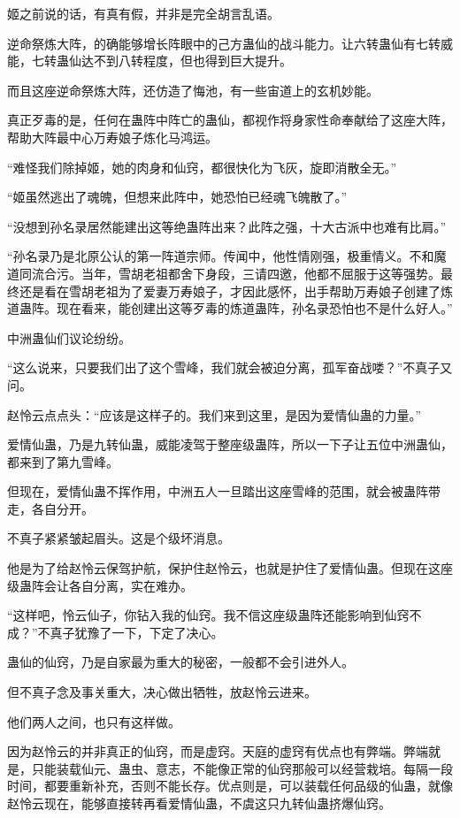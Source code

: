\begin{this_body}
姬之前说的话，有真有假，并非是完全胡言乱语。

逆命祭炼大阵，的确能够增长阵眼中的己方蛊仙的战斗能力。让六转蛊仙有七转威能，七转蛊仙达不到八转程度，但也得到巨大提升。

而且这座逆命祭炼大阵，还仿造了悔池，有一些宙道上的玄机妙能。

真正歹毒的是，任何在蛊阵中阵亡的蛊仙，都视作将身家性命奉献给了这座大阵，帮助大阵最中心万寿娘子炼化马鸿运。

“难怪我们除掉姬，她的肉身和仙窍，都很快化为飞灰，旋即消散全无。”

“姬虽然逃出了魂魄，但想来此阵中，她恐怕已经魂飞魄散了。”

“没想到孙名录居然能建出这等绝蛊阵出来？此阵之强，十大古派中也难有比肩。”

“孙名录乃是北原公认的第一阵道宗师。传闻中，他性情刚强，极重情义。不和魔道同流合污。当年，雪胡老祖都舍下身段，三请四邀，他都不屈服于这等强势。最终还是看在雪胡老祖为了爱妻万寿娘子，才因此感怀，出手帮助万寿娘子创建了炼道蛊阵。现在看来，能创建出这等歹毒的炼道蛊阵，孙名录恐怕也不是什么好人。”

中洲蛊仙们议论纷纷。

“这么说来，只要我们出了这个雪峰，我们就会被迫分离，孤军奋战喽？”不真子又问。

赵怜云点点头：“应该是这样子的。我们来到这里，是因为爱情仙蛊的力量。”

爱情仙蛊，乃是九转仙蛊，威能凌驾于整座级蛊阵，所以一下子让五位中洲蛊仙，都来到了第九雪峰。

但现在，爱情仙蛊不挥作用，中洲五人一旦踏出这座雪峰的范围，就会被蛊阵带走，各自分开。

不真子紧紧皱起眉头。这是个级坏消息。

他是为了给赵怜云保驾护航，保护住赵怜云，也就是护住了爱情仙蛊。但现在这座级蛊阵会让各自分离，实在难办。

“这样吧，怜云仙子，你钻入我的仙窍。我不信这座级蛊阵还能影响到仙窍不成？”不真子犹豫了一下，下定了决心。

蛊仙的仙窍，乃是自家最为重大的秘密，一般都不会引进外人。

但不真子念及事关重大，决心做出牺牲，放赵怜云进来。

他们两人之间，也只有这样做。

因为赵怜云的并非真正的仙窍，而是虚窍。天庭的虚窍有优点也有弊端。弊端就是，只能装载仙元、蛊虫、意志，不能像正常的仙窍那般可以经营栽培。每隔一段时间，都要重新补充，否则不能长存。优点则是，可以装载任何品级的仙蛊，就像赵怜云现在，能够直接转再看爱情仙蛊，不虞这只九转仙蛊挤爆仙窍。


\end{this_body}
